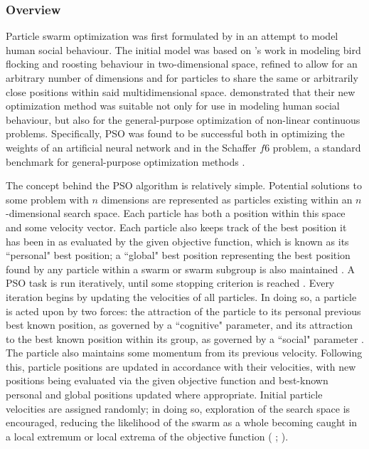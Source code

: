 \documentclass[12pt,a4paper]{article}
\begin{document}
\subsubsection{Overview}
Particle swarm optimization was first formulated by \cite{kennedy1995} in an attempt to model human social behaviour. The initial model was based on \cite{heppner1990}'s work in modeling bird flocking and roosting behaviour in two-dimensional space, refined to allow for an arbitrary number of dimensions and for particles to share the same or arbitrarily close positions within said multidimensional space. \citeauthor{kennedy1995} demonstrated that their new optimization method was suitable not only for use in modeling human social behaviour, but also for the general-purpose optimization of non-linear continuous problems. Specifically, PSO was found to be successful both in optimizing the weights of an artificial neural network and in the Schaffer $f6$ problem, a standard benchmark for general-purpose optimization methods \citep{davis1991}.

The concept behind the PSO algorithm is relatively simple. Potential solutions to some problem with $n$ dimensions are represented as particles existing within an $n$-dimensional search space. Each particle has both a position within this space and some velocity vector. Each particle also keeps track of the best position it has been in as evaluated by the given objective function, which is known as its ``personal" best position; a ``global" best position representing the best position found by any particle within a swarm or swarm subgroup is also maintained \citep{chong2013}. A PSO task is run iteratively, until some stopping criterion is reached \citep{solnon2010}. Every iteration begins by updating the velocities of all particles. In doing so, a particle is acted upon by two forces: the attraction of the particle to its personal previous best known position, as governed by a ``cognitive" parameter, and its attraction to the best known position within its group, as governed by a ``social" parameter \citep{chong2013}. The particle also maintains some momentum from its previous velocity. Following this, particle positions are updated in accordance with their velocities, with new positions being evaluated via the given objective function and best-known personal and global positions updated where appropriate. Initial particle velocities are assigned randomly; in doing so, exploration of the search space is encouraged, reducing the likelihood of the swarm as a whole becoming caught in a local extremum or local extrema of the objective function (\citeauthor{yang2014} \citeyear{yang2014}; \citeauthor{solnon2010} \citeyear{solnon2010}). 
\end{document}
